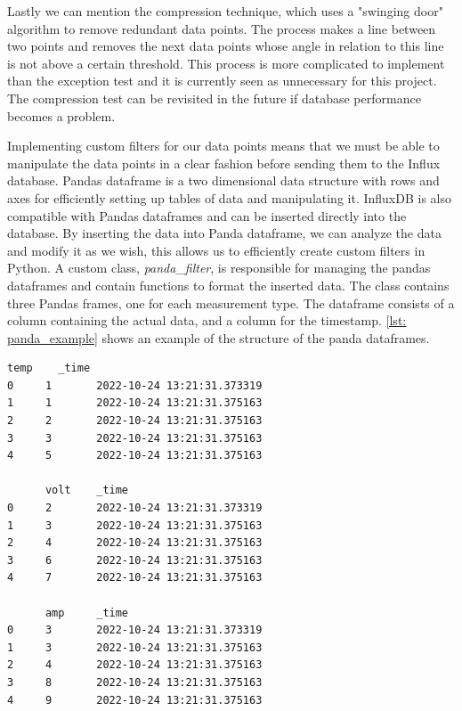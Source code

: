 \documentclass[main.tex]{subfiles}
\begin{document}
 Lastly we can mention the compression technique, which uses a "swinging door" algorithm to remove redundant data points. The process makes a line between two points and removes the next data points whose angle in relation to this line is not above a certain threshold. This process is more complicated to implement than the exception test and it is currently seen as unnecessary for this project. The compression test can be revisited in the future if database performance becomes a problem.
 
 Implementing custom filters for our data points means that we must be able to manipulate the data points in a clear fashion before sending them to the Influx database. Pandas dataframe is a two dimensional data structure with rows and axes for efficiently setting up tables of data and manipulating it. InfluxDB is also compatible with Pandas dataframes and can be inserted directly into the database. By inserting the data into Panda dataframe, we can analyze the data and modify it as we wish, this allows us to efficiently create custom filters in Python. A custom class, \textit{panda\_filter}, is responsible for managing the pandas dataframes and contain functions to format the inserted data. The class contains three Pandas frames, one for each measurement type. The dataframe consists of a column containing the actual data, and a column for the timestamp. \autoref{lst: panda_example} shows an example of the structure of the panda dataframes. 
 
 \begin{lstlisting}[caption={Listing showing the setup of the three dataframes used in the panda filter class.},captionpos=b, label=lst: panda_example]
    temp    _time
0     1       2022-10-24 13:21:31.373319
1     1       2022-10-24 13:21:31.375163
2     2       2022-10-24 13:21:31.375163
3     3       2022-10-24 13:21:31.375163
4     5       2022-10-24 13:21:31.375163

      volt    _time
0     2       2022-10-24 13:21:31.373319
1     3       2022-10-24 13:21:31.375163
2     4       2022-10-24 13:21:31.375163
3     6       2022-10-24 13:21:31.375163
4     7       2022-10-24 13:21:31.375163

      amp     _time
0     3       2022-10-24 13:21:31.373319
1     3       2022-10-24 13:21:31.375163
2     4       2022-10-24 13:21:31.375163
3     8       2022-10-24 13:21:31.375163
4     9       2022-10-24 13:21:31.375163
    \end{lstlisting}
 
\end{document}
